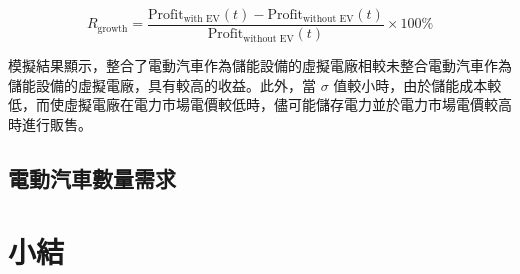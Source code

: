 \begin{equation}\label{equation: Profit Growth Rate}
  R_{\text{growth}} = \frac{\text{Profit}_{\text{with EV}}(t) - \text{Profit}_{\text{without EV}}(t)}{\text{Profit}_{\text{without EV}}(t)} \times 100 \%
\end{equation}

模擬結果顯示，整合了電動汽車作為儲能設備的虛擬電廠相較未整合電動汽車作為儲能設備的虛擬電廠，具有較高的收益。此外，當 $\sigma$ 值較小時，由於儲能成本較低，而使虛擬電廠在電力市場電價較低時，儘可能儲存電力並於電力市場電價較高時進行販售。

\subsection{電動汽車數量需求}

\section{小結}